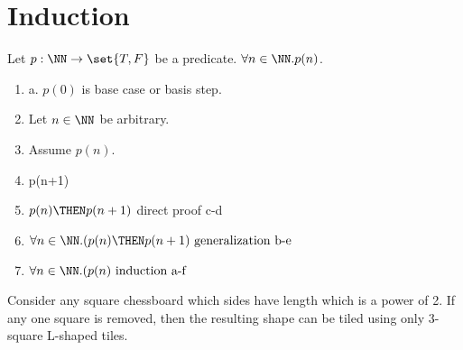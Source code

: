 \documentclass[11pt]{scrartcl}
\begin{document}
\section{Induction}

\begin{example}

  Let $p:\NN\to\set{T, F}$ be a predicate.
  $\forall n \in \NN.p(n)$.

\begin{enumerate}[label=\alph*)]
\item\label{item:1} a. $p(0)$ is base case or basis step.
\item  Let $n\in\NN$ be arbitrary.
\item  Assume $p(n)$.
\item  p(n+1)
\item  $p(n) \THEN p(n+1)$ direct proof c-d
\item 
    $\forall n \in \NN.(p(n) \THEN p(n+1) \text{ generalization b-e }$

\item $\forall n \in \NN.(p(n) \text{ induction a-f }$

\end{enumerate}
\end{example}
\begin{theorem}
  Consider any square chessboard which sides have length which is a
  power of 2. If any one square is removed, then the resulting shape
  can be tiled using only 3-square L-shaped tiles.
\end{theorem}
\end{document}

